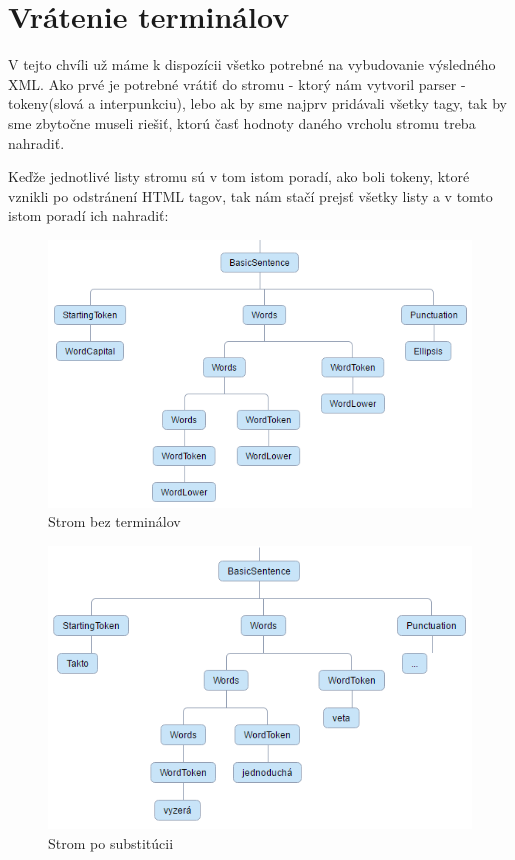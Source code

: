 \documentclass[12pt,a4paper]{report}
\theoremstyle{definition}
\theoremstyle{remark}
\begin{document}
\section{Vrátenie terminálov}

V tejto chvíli už máme k dispozícii všetko potrebné na vybudovanie výsledného XML. Ako prvé je potrebné vrátiť do stromu - ktorý nám vytvoril parser - tokeny(slová a interpunkciu), lebo ak by sme najprv pridávali všetky tagy, tak by sme zbytočne museli riešiť, ktorú časť hodnoty daného vrcholu stromu treba nahradiť.

Keďže jednotlivé listy stromu sú v tom istom poradí, ako boli tokeny, ktoré vznikli po odstránení HTML tagov, tak nám stačí prejsť všetky listy a v tomto istom poradí ich nahradiť:


\begin{figure}[h]
\centering
\includegraphics[scale=2.1]{treeBeforeSubstitution}
\caption{Strom bez terminálov}
\end{figure}

\begin{figure}[H]
\includegraphics[scale=2.1]{treeAfterSubstitution}
\caption{Strom po substitúcii}
\end{figure}
\end{document}
